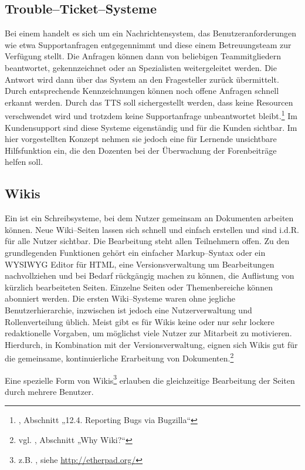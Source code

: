 \subsection{Trouble–Ticket–Systeme} %
\label{sub:trouble_ticket_systmee}
Bei einem  handelt es sich um ein Nachrichtensystem, das Benutzeranforderungen wie etwa Supportanfragen entgegennimmt und diese einem Betreuungsteam zur Verfügung stellt. Die Anfragen können dann von beliebigen Teammitgliedern beantwortet, gekennzeichnet oder an Spezialisten weitergeleitet werden. Die Antwort wird dann über das System an den Fragesteller zurück übermittelt. Durch entsprechende Kennzeichnungen können noch offene Anfragen schnell erkannt werden. Durch das \ac{TTS} soll sichergestellt werden, dass keine Resourcen verschwendet wird und trotzdem keine Supportanfrage unbeantwortet bleibt.\footnote{\cite{nna}, Abschnitt „12.4. Reporting Bugs via Bugzilla“} Im Kundensupport sind diese Systeme eigenständig und für die Kunden sichtbar. Im hier vorgestellten Konzept nehmen sie jedoch eine für Lernende unsichtbare Hilfsfunktion ein, die den Dozenten bei der Überwachung der Forenbeiträge helfen soll.

\subsection{Wikis} %
\label{sub:wikis}
Ein  ist ein Schreibsysteme, bei dem Nutzer gemeinsam an Dokumenten arbeiten können. Neue Wiki--Seiten lassen sich schnell und einfach erstellen und sind i.d.R. für alle Nutzer sichtbar. Die Bearbeitung steht allen Teilnehmern offen. Zu den grundlegenden Funktionen gehört ein einfacher Markup--Syntax oder ein \ac{WYSIWYG} Editor für \ac{HTML}, eine Versionsverwaltung um Bearbeitungen nachvollziehen und bei Bedarf rückgängig machen zu können, die Auflistung von kürzlich bearbeiteten Seiten. Einzelne Seiten oder Themenbereiche können abonniert werden. Die ersten Wiki--Systeme waren ohne jegliche Benutzerhierarchie, inzwischen ist jedoch eine Nutzerverwaltung und Rollenverteilung üblich. Meist gibt es für Wikis keine oder nur sehr lockere redaktionelle Vorgaben, um möglichst viele Nutzer zur Mitarbeit zu motivieren. Hierdurch, in Kombination mit der Versionsverwaltung, eignen sich Wikis gut für die gemeinsame, kontinuierliche Erarbeitung von Dokumenten.\footnote{vgl. \cite{cunningham}, Abschnitt „Why Wiki?“}

Eine spezielle Form von Wikis\footnote{z.B. , siehe \url{http://etherpad.org/}} erlauben die gleichzeitige Bearbeitung der Seiten durch mehrere Benutzer.

